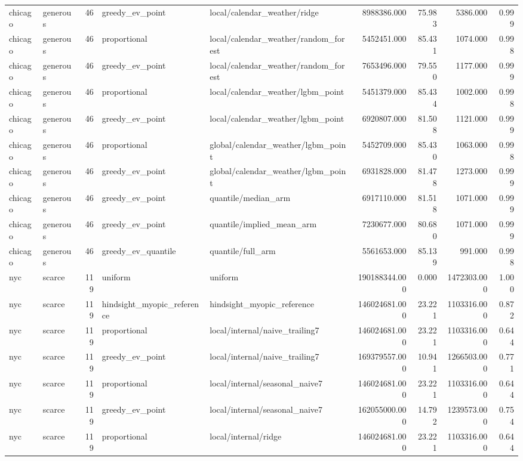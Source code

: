\begin{tabular}{llrllrrrr}
chicago & generous & 46 & greedy\_ev\_point & local/calendar\_weather/ridge & 8988386.000 & 75.983 & 5386.000 & 0.999 \\
chicago & generous & 46 & proportional & local/calendar\_weather/random\_forest & 5452451.000 & 85.431 & 1074.000 & 0.998 \\
chicago & generous & 46 & greedy\_ev\_point & local/calendar\_weather/random\_forest & 7653496.000 & 79.550 & 1177.000 & 0.999 \\
chicago & generous & 46 & proportional & local/calendar\_weather/lgbm\_point & 5451379.000 & 85.434 & 1002.000 & 0.998 \\
chicago & generous & 46 & greedy\_ev\_point & local/calendar\_weather/lgbm\_point & 6920807.000 & 81.508 & 1121.000 & 0.999 \\
chicago & generous & 46 & proportional & global/calendar\_weather/lgbm\_point & 5452709.000 & 85.430 & 1063.000 & 0.998 \\
chicago & generous & 46 & greedy\_ev\_point & global/calendar\_weather/lgbm\_point & 6931828.000 & 81.478 & 1273.000 & 0.999 \\
chicago & generous & 46 & greedy\_ev\_point & quantile/median\_arm & 6917110.000 & 81.518 & 1071.000 & 0.999 \\
chicago & generous & 46 & greedy\_ev\_point & quantile/implied\_mean\_arm & 7230677.000 & 80.680 & 1071.000 & 0.999 \\
chicago & generous & 46 & greedy\_ev\_quantile & quantile/full\_arm & 5561653.000 & 85.139 & 991.000 & 0.998 \\
nyc & scarce & 119 & uniform & uniform & 190188344.000 & 0.000 & 1472303.000 & 1.000 \\
nyc & scarce & 119 & hindsight\_myopic\_reference & hindsight\_myopic\_reference & 146024681.000 & 23.221 & 1103316.000 & 0.872 \\
nyc & scarce & 119 & proportional & local/internal/naive\_trailing7 & 146024681.000 & 23.221 & 1103316.000 & 0.644 \\
nyc & scarce & 119 & greedy\_ev\_point & local/internal/naive\_trailing7 & 169379557.000 & 10.941 & 1266503.000 & 0.771 \\
nyc & scarce & 119 & proportional & local/internal/seasonal\_naive7 & 146024681.000 & 23.221 & 1103316.000 & 0.644 \\
nyc & scarce & 119 & greedy\_ev\_point & local/internal/seasonal\_naive7 & 162055000.000 & 14.792 & 1239573.000 & 0.754 \\
nyc & scarce & 119 & proportional & local/internal/ridge & 146024681.000 & 23.221 & 1103316.000 & 0.644 \\

\end{tabular}
